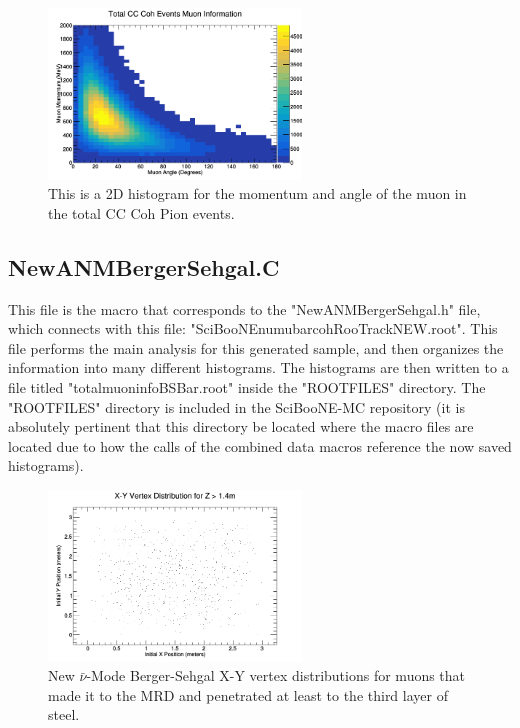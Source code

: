 \documentclass[11pt]{article}
\begin{document}
\begin{figure}[H]
\centering
\includegraphics[width=0.6\textwidth]{NewANMReinSehgalImages/9-TotalCCCohMuonInfoANMRS.png}
\caption{This is a 2D histogram for the momentum and angle of the muon in the total CC Coh Pion events.}
\end{figure}


\subsection{NewANMBergerSehgal.C}
This file is the macro that corresponds to the "NewANMBergerSehgal.h" file, which connects with this file: "SciBooNE\textunderscore numubar\textunderscore coh\textunderscore RooTrack\textunderscore NEW.root". This file performs the main analysis for this generated sample, and then organizes the information into many different histograms. The histograms are then written to a file titled "totalmuoninfoBSBar.root" inside the "ROOTFILES" directory. The "ROOTFILES" directory is included in the SciBooNE-MC repository (it is absolutely pertinent that this directory be located where the macro files are located due to how the calls of the combined data macros reference the now saved histograms).

\begin{figure}[H]
\centering
\includegraphics[width=0.6\textwidth]{NewANMBergerSehgalImages/1-X-YVertexDistributionANMBS.png}
\caption{New $\bar{\nu}$-Mode Berger-Sehgal X-Y vertex distributions for muons that made it to the MRD and penetrated at least to the third layer of steel.}
\end{figure}
\end{document}
